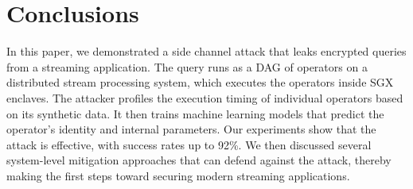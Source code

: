 \section{Conclusions}
\label{sec:conclusions}
In this paper, we demonstrated a side channel attack that leaks encrypted queries from a streaming application. The query runs as a DAG of operators on a distributed stream processing system, which executes the operators inside SGX enclaves. The attacker profiles the execution timing of individual operators based on its synthetic data. It then trains machine learning models that predict the operator's identity and internal parameters. Our experiments show that the attack is effective, with success rates up to 92\%. We then discussed several system-level mitigation approaches that can defend against the attack, thereby making the first steps toward securing modern streaming applications. 
